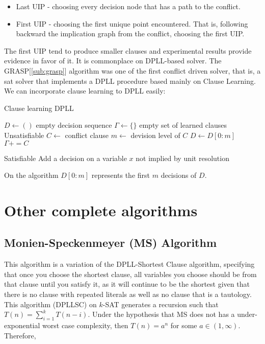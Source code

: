 \begin{itemize}
\item Last UIP - choosing every decision node that has a path to the conflict.
\item First UIP - choosing the first unique point encountered. That is, following backward the implication graph from the conflict, choosing the first UIP.
\end{itemize}


The first UIP tend to produce smaller clauses and experimental results \cite{tichy2006clause} \cite{zhang2001efficient} provide evidence in favor of it. It is commonplace on DPLL-based solver. The GRASP[\ref{sub:grasp}] algorithm was one of the first conflict driven solver, that is, a sat solver that implements a DPLL procedure based mainly on Clause Learning. \\

We can incorporate clause learning to DPLL easily:
\begin{algorithm}    
  \caption{Clause learning DPLL \cite{darwiche2009complete}}\label{cldpll}
  \begin{algorithmic}[1]
    \State $D \gets ()$ empty decision sequence
	\State $\Gamma \gets \{\}$ empty set of learned clauses
			 \Return Unsatisfiable
			\Else
				\State $C \gets $ conflict clause
				\State $m \gets $ devision level of $C$
				\State $D \gets D[0:m]$ 
				\State $\Gamma += C$
			\EndIf

		\Else
				\State\Return Satisfiable
			\Else
				\State Add a decision on a variable $x$ not implied by unit resolution 
			\EndIf
		\EndIf
	\EndWhile
\EndProcedure
\end{algorithmic}
\end{algorithm}

On the algorithm $D[0:m]$ represents the first $m$ decisions of $D$.


\section{Other complete algorithms}

\subsection{Monien-Speckenmeyer (MS) Algorithm}
\label{alg:MS}
This algorithm is a variation of the DPLL-Shortest Clause algorithm, specifying that once you choose the shortest clause, all variables you choose should be from that clause until you satisfy it, as it will continue to be the shortest given that there is no clause with repeated literals as well as no clause that is a tautology. This algorithm (DPLLSC) on $k$-SAT generates a recursion such that $T(n) = \sum_{i=1}^kT(n-i)$. Under the hypothesis that MS does not has a under-exponential worst case complexity, then $T(n) = a^n$ for some $a \in (1,\infty)$.  Therefore,

